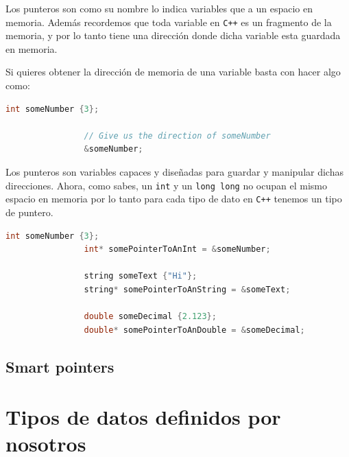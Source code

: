 \documentclass[12pt, fleqn]{report}                             %
\newcommand \Quote              {\qq}                           %
\theoremstyle{break}                                            %
\newcommand{\textCode}[1]  { \texttt{#1} }                      %
\newcommand{\Cpp}{\ignorespaces\textCode{C++}}                  %
\begin{document}
            Los punteros son como su nombre lo indica variables que \Quote{apuntan} a un espacio en memoria.
            Además recordemos que toda variable en \Cpp es un fragmento de la memoria, y por lo tanto tiene
            una dirección donde dicha variable esta guardada en memoria.

            Si quieres obtener la dirección de memoria de una variable basta con hacer algo como:
            \begin{lstlisting}[language=C++, gobble=16]
                int someNumber {3};

                // Give us the direction of someNumber
                &someNumber;
            \end{lstlisting}

            Los punteros son variables capaces y diseñadas para guardar y manipular dichas direcciones.
            Ahora, como sabes, un \textCode{int} y un \textCode{long long} no ocupan el 
            mismo espacio en memoria por lo tanto para cada tipo de dato en \Cpp tenemos un tipo de puntero.
            \begin{lstlisting}[language=C++, gobble=16]
                int someNumber {3};
                int* somePointerToAnInt = &someNumber;

                string someText {"Hi"};
                string* somePointerToAnString = &someText;

                double someDecimal {2.123};
                double* somePointerToAnDouble = &someDecimal;
            \end{lstlisting}

        \clearpage
        \section{Smart pointers}

    \clearpage
    \chapter{Tipos de datos definidos por nosotros}
\end{document}
